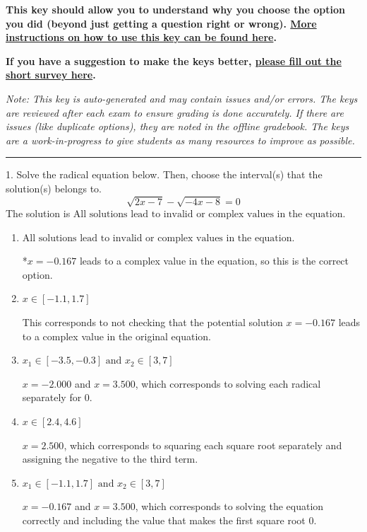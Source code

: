 \documentclass{extbook}[14pt]
\begin{document}
\textbf{This key should allow you to understand why you choose the option you did (beyond just getting a question right or wrong). \href{https://xronos.clas.ufl.edu/mac1105spring2020/courseDescriptionAndMisc/Exams/LearningFromResults}{More instructions on how to use this key can be found here}.}

\textbf{If you have a suggestion to make the keys better, \href{https://forms.gle/CZkbZmPbC9XALEE88}{please fill out the short survey here}.}

\textit{Note: This key is auto-generated and may contain issues and/or errors. The keys are reviewed after each exam to ensure grading is done accurately. If there are issues (like duplicate options), they are noted in the offline gradebook. The keys are a work-in-progress to give students as many resources to improve as possible.}

\rule{\textwidth}{0.4pt}

1. Solve the radical equation below. Then, choose the interval(s) that the solution(s) belongs to.
\[ \sqrt{2 x - 7} - \sqrt{-4 x - 8} = 0 \] 
The solution is $ \text{All solutions lead to invalid or complex values in the equation.} $ 

\begin{enumerate}[label=\Alph*.] 
\item $ \text{All solutions lead to invalid or complex values in the equation.} $ 

 *$x = -0.167$ leads to a complex value in the equation, so this is the correct option. 
\item $ x \in [-1.1,1.7] $ 

 This corresponds to not checking that the potential solution $x = -0.167$ leads to a complex value in the original equation. 
\item $ x_1 \in [-3.5, -0.3] \text{ and } x_2 \in [3,7] $ 

 $x = -2.000$ and $x = 3.500$, which corresponds to solving each radical separately for 0. 
\item $ x \in [2.4,4.6] $ 

 $x = 2.500$, which corresponds to squaring each square root separately and assigning the negative to the third term. 
\item $ x_1 \in [-1.1, 1.7] \text{ and } x_2 \in [3,7] $ 

 $x = -0.167$ and $x = 3.500$, which corresponds to solving the equation correctly and including the value that makes the first square root 0. 
\end{enumerate} 
 
\end{document}

